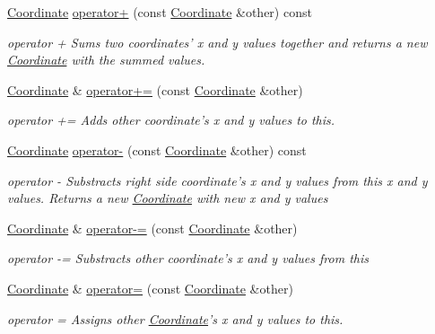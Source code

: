 \begin{DoxyCompactItemize}
\item 
\hyperlink{class_course_1_1_coordinate}{Coordinate} \hyperlink{class_course_1_1_coordinate_a7edcfb76ac047152ab2e241833b3109b}{operator+} (const \hyperlink{class_course_1_1_coordinate}{Coordinate} \&other) const 
\begin{DoxyCompactList}\small\item\em operator + Sums two coordinates' x and y values together and returns a new \hyperlink{class_course_1_1_coordinate}{Coordinate} with the summed values. \end{DoxyCompactList}\item 
\hyperlink{class_course_1_1_coordinate}{Coordinate} \& \hyperlink{class_course_1_1_coordinate_aa9191a6d4f7093572be0a82764ef972f}{operator+=} (const \hyperlink{class_course_1_1_coordinate}{Coordinate} \&other)
\begin{DoxyCompactList}\small\item\em operator += Adds other coordinate's x and y values to this. \end{DoxyCompactList}\item 
\hyperlink{class_course_1_1_coordinate}{Coordinate} \hyperlink{class_course_1_1_coordinate_af88f0780b55f3496322bdde1646d2e7f}{operator-\/} (const \hyperlink{class_course_1_1_coordinate}{Coordinate} \&other) const 
\begin{DoxyCompactList}\small\item\em operator -\/ Substracts right side coordinate's x and y values from this x and y values. Returns a new \hyperlink{class_course_1_1_coordinate}{Coordinate} with new x and y values \end{DoxyCompactList}\item 
\hyperlink{class_course_1_1_coordinate}{Coordinate} \& \hyperlink{class_course_1_1_coordinate_ab22b7e48298bdf3c493bdf33f750fc37}{operator-\/=} (const \hyperlink{class_course_1_1_coordinate}{Coordinate} \&other)
\begin{DoxyCompactList}\small\item\em operator -\/= Substracts other coordinate's x and y values from this \end{DoxyCompactList}\item 
\hyperlink{class_course_1_1_coordinate}{Coordinate} \& \hyperlink{class_course_1_1_coordinate_a3d564384a0b5e9cf588bddb0f49f22fa}{operator=} (const \hyperlink{class_course_1_1_coordinate}{Coordinate} \&other)
\begin{DoxyCompactList}\small\item\em operator = Assigns other \hyperlink{class_course_1_1_coordinate}{Coordinate}'s x and y values to this. \end{DoxyCompactList}\item 

\end{DoxyCompactItemize}
